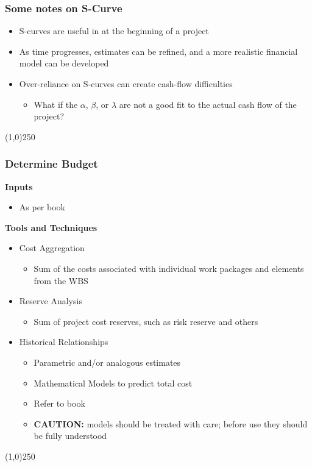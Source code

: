 \begin{frame}
\frametitle{Some notes on S-Curve}
\begin{itemize}
	\item S-curves are useful in at the beginning of a project
	\item As time progresses, estimates can be refined, and a more realistic financial model can be developed
	\item Over-reliance on S-curves can create cash-flow difficulties
	\begin{itemize}
		\item What if the $\alpha$, $\beta$, or $\lambda$ are not a good fit to the actual cash flow of the project?
	\end{itemize}
\end{itemize}	
\end{frame}
\begin{center}\line(1,0){250}\end{center}






\begin{frame}
\frametitle{Determine Budget}
\textbf{Inputs}
\begin{itemize}
	\item As per book
\end{itemize}
\textbf{Tools and Techniques}
\begin{itemize}
	\item Cost Aggregation
	\begin{itemize}
		\item Sum of the costs associated with individual work packages and elements from the WBS
	\end{itemize}
	\item Reserve Analysis
	\begin{itemize}
		\item Sum of project cost reserves, such as risk reserve and others
	\end{itemize}
	\item Historical Relationships
	\begin{itemize}
		\item Parametric and/or analogous estimates
		\item Mathematical Models to predict total cost
		\item Refer to book 
		\item\textbf{CAUTION:} models should be treated with care; before use they should be fully understood
	\end{itemize}
\end{itemize}
\end{frame}
\begin{center}\line(1,0){250}\end{center}






